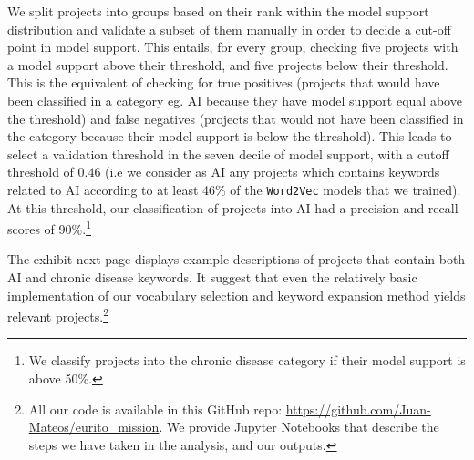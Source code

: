 \documentclass[11pt]{article}
\begin{document}
We split projects into groups based on their rank within the model support distribution and validate a subset of them manually in order to decide a cut-off point in model support. This entails, for every group, checking five projects with a model support above their threshold, and five projects below their threshold. This is the equivalent of checking for true positives (projects that would have been classified in a category eg. AI because they have model support equal above the threshold) and false negatives (projects that would not have been classified in the category because their model support is below the threshold). This leads to select a validation threshold in the seven decile of model support, with a cutoff threshold of $0.46$ (i.e we consider as AI any projects which contains keywords related to AI according to at least 46\% of the \texttt{Word2Vec} models that we trained). At this threshold, our classification of projects into AI had a precision and recall scores of 90\%.\footnote{We classify projects into the chronic disease category if their model support is above 50\%.}

The exhibit next page displays example descriptions of projects that contain both AI and chronic disease keywords. It suggest that even the relatively basic implementation of our vocabulary selection and keyword expansion method yields relevant projects.\footnote{All our code is available in this GitHub repo: \hyperref[https://github.com/Juan-
Mateos/eurito_mission]{https://github.com/Juan-
Mateos/eurito\_mission}. We provide Jupyter Notebooks that describe the steps we have taken in the analysis, and our outputs.}
\end{document}
